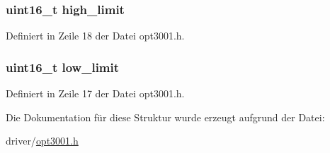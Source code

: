 \subsubsection[{high\+\_\+limit}]{\setlength{\rightskip}{0pt plus 5cm}uint16\+\_\+t high\+\_\+limit}\label{structopt3001__stc_af121d4246e275920873b33ad155fa9ba}


Definiert in Zeile 18 der Datei opt3001.\+h.

\hypertarget{structopt3001__stc_a5561e4eedc9af4ceb86ed5056241bf77}{}
\subsubsection[{low\+\_\+limit}]{\setlength{\rightskip}{0pt plus 5cm}uint16\+\_\+t low\+\_\+limit}\label{structopt3001__stc_a5561e4eedc9af4ceb86ed5056241bf77}


Definiert in Zeile 17 der Datei opt3001.\+h.



Die Dokumentation für diese Struktur wurde erzeugt aufgrund der Datei\+:\begin{DoxyCompactItemize}
\item 
driver/\hyperlink{opt3001_8h}{opt3001.\+h}\end{DoxyCompactItemize}
